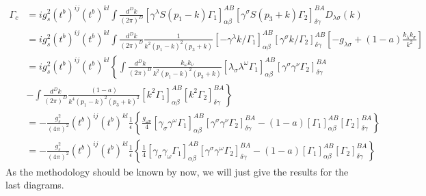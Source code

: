 	\begin{equation}
		\begin{split}
			\Gamma_c &= i g_s^2 (t^b)^{ij}(t^b)^{kl} \int \frac{d^Dk}{(2\pi)^D} \left[\gamma^\lambda S(p_1-k) \Gamma_1 \right]^{AB}_{\alpha\beta} \left[\gamma^\sigma S(p_3 + k) \Gamma_2 \right]^{BA}_{\delta\gamma} D_{\lambda\sigma}(k) \\
			&= i g_s^2 (t^b)^{ij}(t^b)^{kl} \int \frac{d^Dk}{(2\pi)^D} \frac{1}{k^2(p_1-k)^2(p_3+k)} \left[-\gamma^\lambda k\!\!\!/ \Gamma_1 \right]^{AB}_{\alpha\beta} \left[\gamma^\sigma k\!\!\!/ \Gamma_2 \right]^{AB}_{\delta\gamma} \left[-g_{\lambda\sigma} + (1-a) \frac{k_\lambda k_\sigma}{k^2} \right] \\
			&= i g_s^2 (t^b)^{ij} (t^b)^{kl}\left\{ \int \frac{d^Dk}{(2\pi)^D} \frac{k_\omega k_\nu}{k^2(p_1-k)^2(p_3+k)} \left[\lambda_\sigma \lambda^\omega \Gamma_1 \right]^{AB}_{\alpha\beta} \left[\gamma^\sigma \gamma^\nu \Gamma_2\right]^{BA}_{\delta\gamma} \right. \\
			& \left. - \int \frac{d^Dk}{(2\pi)^D} \frac{(1-a)}{k^4(p_1 -k)^2(p_3+k)^2} \left[k^2 \Gamma_1\right]^{AB}_{\alpha\beta} \left[k^2 \Gamma_2\right]^{BA}_{\delta\gamma} \right\} \\
			&= - \frac{g^2_s}{(4\pi)^2} (t^b)^{ij} (t^b)^{kl} \frac{1}{\epsilon} \left\{ \frac{g_{\omega\nu}}{4} \left[\gamma_\sigma \gamma^\omega \Gamma_1 \right]^{AB}_{\alpha\beta} \left[\gamma^\sigma \gamma^\nu \Gamma_2 \right]^{BA}_{\delta\gamma} - (1-a) \left[\Gamma_1\right]^{AB}_{\alpha\beta} \left[\Gamma_2\right]^{BA}_{\delta\gamma}\right\}  \\
			&= - \frac{g^2_s}{(4\pi)^2} (t^b)^{ij} (t^b)^{kl} \frac{1}{\epsilon} \left\{ \frac{1}{4} \left[\gamma_\sigma \gamma_\omega \Gamma_1 \right]^{AB}_{\alpha\beta} \left[\gamma^\sigma \gamma^\omega \Gamma_2 \right]^{BA}_{\delta\gamma} - (1-a) \left[\Gamma_1\right]^{AB}_{\alpha\beta} \left[\Gamma_2\right]^{BA}_{\delta\gamma}\right\} 
		\end{split}
	\end{equation}
	As the methodology should be known by now, we will just give the results for the last diagrams.

